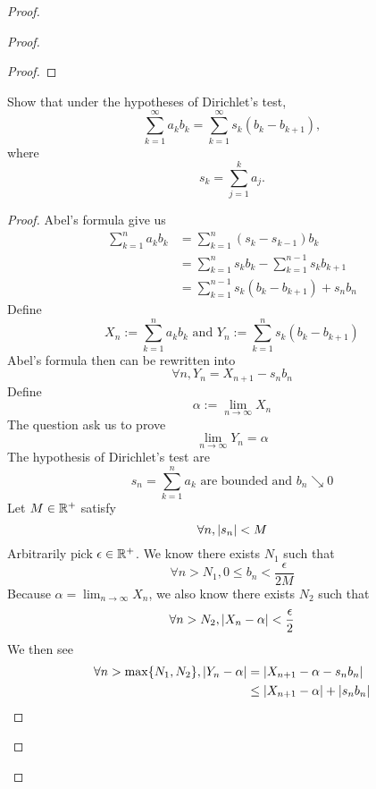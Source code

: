 \documentclass{report}
\begin{document}
\begin{proof}
\begin{proof}
\begin{proof}
\end{proof}

\begin{question}{}{}
Show that under the hypotheses of Dirichlet’s test,
\[
\sum_{k=1}^{\infty} a_k b_k = \sum_{k=1}^{\infty} s_k (b_k - b_{k+1}),
\]
where 
\[
s_k = \sum_{j=1}^{k} a_j.
\]
\end{question}
\begin{proof}
Abel's formula give us
\begin{align}
\sum_{k=1}^na_kb_k&=\sum_{k=1}^n (s_{k}-s_{k-1})b_k\\
&=\sum_{k=1}^n s_kb_k-\sum_{k=1}^{n-1} s_kb_{k+1}\\
&=\sum_{k=1}^{n-1}s_k(b_k-b_{k+1})+s_nb_n
\end{align}
Define 
\begin{equation}
X_n:=\sum_{k=1}^n a_kb_k\text{ and }Y_n:=\sum_{k=1}^{n}s_k(b_k-b_{k+1})
\end{equation}
Abel's formula then can be rewritten into
\begin{equation}
\forall n,Y_n=X_{n+1}-s_nb_n
\end{equation}
Define
\begin{equation}
\alpha :=\lim_{n\to\infty}X_n 
\end{equation}
The question ask us to prove
\begin{equation}
\lim_{n\to\infty}Y_n=\alpha 
\end{equation}
The hypothesis of Dirichlet's test are 
\begin{equation}
  s_n=\sum_{k=1}^n a_k\text{ are bounded and }b_n\searrow 0 
\end{equation}
Let $M\in\mathbb{R}^+$ satisfy
\begin{equation}
\forall n, |s_n|<M
\end{equation}
Arbitrarily pick $\epsilon\in\mathbb{R}^+$. We know there exists $N_1$ such that
 \begin{equation}
\forall n>N_1, 0\leq b_n<\frac{\epsilon }{2M}
\end{equation}
Because  $\alpha =\lim_{n\to\infty}X_n$, we also know there exists $N_2$ such that
 \begin{equation}
\forall n>N_2, |X_n-\alpha |<\frac{\epsilon }{2}
\end{equation}
We then see 
\begin{align}
  \forall n>\max \set{N_1,N_2}, \abso{Y_n-\alpha }&=\abso{X_{n+1}-\alpha -s_nb_n}\\
  &\leq \abso{X_{n+1}-\alpha }+\abso{s_nb_n}\\

\end{align}
\end{proof}
\end{proof}
\end{proof}
\end{document}

